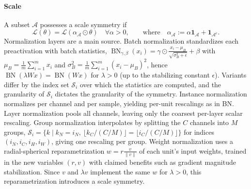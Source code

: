 \documentclass[mathematics,review,submit,moreauthors]{Definitions/mdpi}
\begin{document}
\paragraph{Scale}
A subset $\mathcal{A}$ possesses a scale symmetry if \citep{kunin2020}
\begin{equation*}
    \mathcal{L}(\theta)=\mathcal{L}(\alpha_{\mathcal{A}}\odot\theta) \quad \forall\alpha>0, \qquad \text{where}\quad \alpha_{\mathcal{A}}:=\alpha\boldsymbol{1}_{\mathcal{A}}+\boldsymbol{1}_{\mathcal{A}^{c}}.
\end{equation*}
Normalization layers are a main source.
Batch normalization \citep{ioffe2015p3icml} standardizes each preactivation with batch statistics, $\operatorname{BN}_{\gamma,\beta}(x_i)=\gamma\odot\frac{x_i-\mu_B}{\sqrt{\sigma_B^2+\epsilon}}+\beta$ with $\mu_B=\frac{1}{m}\sum_{i=1}^{m}x_i$ and $\sigma_B^2=\frac{1}{m}\sum_{i=1}^{m}(x_i-\mu_B)^2$, hence $\operatorname{BN}(\lambda Wx)=\operatorname{BN}(Wx)$ for $\lambda>0$ (up to the stabilizing constant $\epsilon$).
Variants differ by the index set $\mathcal{S}_i$ over which the statistics are computed, and the granularity of $\mathcal{S}_i$ dictates the granularity of the symmetry.
Instance normalization \citep{ulyanov2017} normalizes per channel and per sample, yielding per-unit rescalings as in BN.
Layer normalization \citep{ba2016} pools all channels, leaving only the coarsest per-layer scalar rescaling.
Group normalization \citep{wu2018a} interpolates by splitting the $C$ channels into $M$ groups, $\mathcal{S}_i=\big\{k \mid k_N=i_N,\ \lfloor k_C/(C/M)\rfloor=\lfloor i_C/(C/M)\rfloor\big\}$ for indices $(i_N,i_C,i_H,i_W)$, giving one rescaling per group.
Weight normalization \citep{salimans2016anips} uses a radial-spherical reparametrization $w=r\frac{v}{\lVert v\rVert}$ of each unit's input weights, trained in the new variables $(r,v)$ with claimed benefits such as gradient magnitude stabilization.
Since $v$ and $\lambda v$ implement the same $w$ for $\lambda>0$, this reparametrization introduces a scale symmetry.
\end{document}
